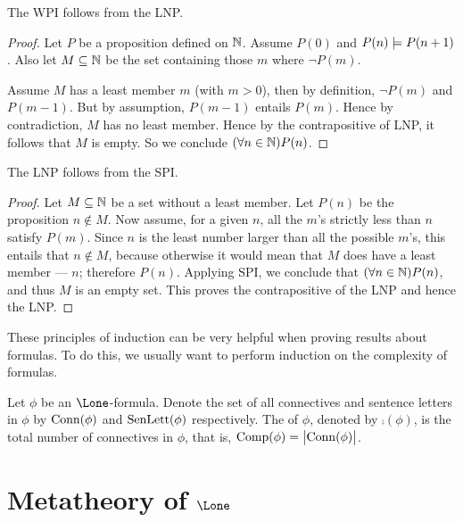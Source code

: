 \documentclass{styles/tufte}
\begin{document}
\begin{theorem}{}{}
  The WPI follows from the LNP.
\end{theorem}
\begin{proof}
  Let $P$ be a proposition defined on $\mathbb{N}$. Assume $P(0)$ and $P(n) \entails P(n + 1)$. Also let $M \subseteq \mathbb{N}$ be the set containing those $m$ where $\neg P(m)$.
  
  Assume $M$ has a least member $m$ (with $m > 0$), then by definition, $\neg P(m)$ and $P(m - 1)$. But by assumption, $P(m - 1)$ entails $P(m)$. Hence by contradiction, $M$ has no least member. Hence by the contrapositive of LNP, it follows that $M$ is empty. So we conclude $(\forall n \in \mathbb{N}) P(n)$.
\end{proof}

\begin{theorem}{}{}
  The LNP follows from the SPI.
\end{theorem}
\begin{proof}
  Let $M \subseteq \mathbb{N}$ be a set without a least member. Let $P(n)$ be the proposition $n \notin M$. Now assume, for a given $n$, all the $m$'s strictly less than $n$ satisfy $P(m)$. Since $n$ is the least number larger than all the possible $m$'s, this entails that $n \notin M$, because otherwise it would mean that $M$ does have a least member --- $n$; therefore $P(n)$. Applying SPI, we conclude that $(\forall n \in \mathbb{N}) P(n)$, and thus $M$ is an empty set. This proves the contrapositive of the LNP and hence the LNP.
\end{proof}

These principles of induction can be very helpful when proving results about formulas. To do this, we usually want to perform induction on the complexity of formulas.

\begin{definition}{}{}
  Let $\phi$ be an $\Lone$-formula. Denote the set of all connectives and sentence letters in $\phi$ by $\operatorname{Conn}(\phi)$ and $\operatorname{SenLett}(\phi)$ respectively. The  of $\phi$, denoted by $\comp(\phi)$, is the total number of connectives in $\phi$, that is, $\comp(\phi) = \abs{\conn(\phi)}$.
\end{definition}



\newpage
\section[Metatheory of $\Lone$]{Metatheory of ${\boldsymbol\Lone}$}
\end{document}
